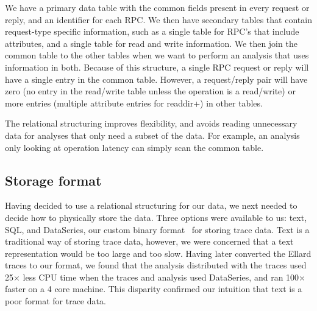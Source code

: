 We have a primary data table with the common fields present in every
request or reply, and an identifier for each RPC.  We then have
secondary tables that contain request-type specific information, such
as a single table for RPC's that include attributes, and a single
table for read and write information.  We then join the common table
to the other tables when we want to perform an analysis that uses
information in both.  Because of this structure, a single RPC request
or reply will have a single entry in the common table.  However, a
request/reply pair will have zero (no entry in the read/write table
unless the operation is a read/write) or more entries (multiple
attribute entries for readdir+) in other tables.

The relational structuring improves flexibility, and avoids reading unnecessary data for
analyses that only need a subset of the data.
For example, an analysis only looking at operation
latency can simply scan the common table.

\subsection{Storage format}

Having decided to use a relational structuring for our data, we next
needed to decide how to physically store the data.  Three
options were available to us: text, SQL, and DataSeries, our custom
binary format~\cite{DSTechnicalReportSnapshot} for storing trace data.
Text is a traditional way of storing trace data, however, we were
concerned that a text representation would be too large and too slow.
Having later converted the Ellard traces to our format, we found that
the analysis distributed with the traces used 25$\times$ less CPU time when
the traces and analysis used DataSeries, and ran 100$\times$ faster on a 4
core machine. This disparity confirmed our intuition that text is a
poor format for trace data.



